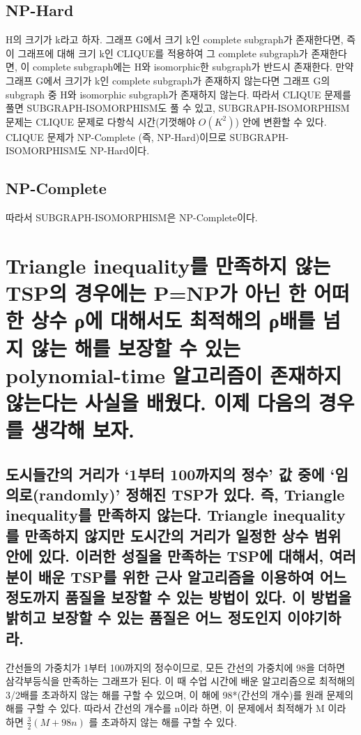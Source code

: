 \documentclass{article}
\begin{document}
\subsection{NP-Hard}
H의 크기가 k라고 하자. 그래프 G에서 크기 k인 complete subgraph가 존재한다면, 즉 이 그래프에 대해 크기 k인 CLIQUE를 적용하여 그 complete subgraph가 존재한다면, 이 complete subgraph에는 H와 isomorphic한 subgraph가 반드시 존재한다. 만약 그래프 G에서 크기가 k인 complete subgraph가 존재하지 않는다면 그래프 G의 subgraph 중 H와 isomorphic subgraph가 존재하지 않는다. 따라서 CLIQUE 문제를 풀면 SUBGRAPH-ISOMORPHISM도 풀 수 있고, SUBGRAPH-ISOMORPHISM 문제는 CLIQUE 문제로 다항식 시간(기껏해야 $O(K^2)$) 안에 변환할 수 있다. CLIQUE 문제가 NP-Complete (즉, NP-Hard)이므로 SUBGRAPH-ISOMORPHISM도 NP-Hard이다.

\subsection{NP-Complete}
따라서 SUBGRAPH-ISOMORPHISM은 NP-Complete이다.

\section{Triangle inequality를 만족하지 않는 TSP의 경우에는 P=NP가 아닌 한 어떠한 상수 ρ에 대해서도 최적해의 ρ배를 넘지 않는 해를 보장할 수 있는 polynomial-time 알고리즘이 존재하지 않는다는 사실을 배웠다. 이제 다음의 경우를 생각해 보자.}
\subsection{도시들간의 거리가 ‘1부터 100까지의 정수’ 값 중에 ‘임의로(randomly)’ 정해진 TSP가 있다. 즉, Triangle inequality를 만족하지 않는다. Triangle inequality를 만족하지 않지만 도시간의 거리가 일정한 상수 범위 안에 있다. 이러한 성질을 만족하는 TSP에 대해서, 여러분이 배운 TSP를 위한 근사 알고리즘을 이용하여 어느 정도까지 품질을 보장할 수 있는 방법이 있다. 이 방법을 밝히고 보장할 수 있는 품질은 어느 정도인지 이야기하라.}
간선들의 가중치가 1부터 100까지의 정수이므로, 모든 간선의 가중치에 98을 더하면 삼각부등식을 만족하는 그래프가 된다. 이 때 수업 시간에 배운 알고리즘으로 최적해의 3/2배를 초과하지 않는 해를 구할 수 있으며, 이 해에 98*(간선의 개수)를 원래 문제의 해를 구할 수 있다. 따라서 간선의 개수를 n이라 하면, 이 문제에서 최적해가 M 이라 하면 $\frac 32 (M + 98 n)$ 를 초과하지 않는 해를 구할 수 있다.
\end{document}
